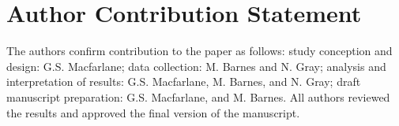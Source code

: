 \documentclass[3p, authoryear]{elsarticle} %
\begin{document}
\hypertarget{author-contribution-statement}{%
\section*{Author Contribution Statement}\label{author-contribution-statement}}

The authors confirm contribution to the paper as follows: study conception and
design: G.S. Macfarlane; data collection: M. Barnes and N. Gray; analysis and
interpretation of results: G.S. Macfarlane, M. Barnes, and N. Gray; draft
manuscript preparation: G.S. Macfarlane, and M. Barnes. All authors reviewed the
results and approved the final version of the manuscript.


\end{document}
